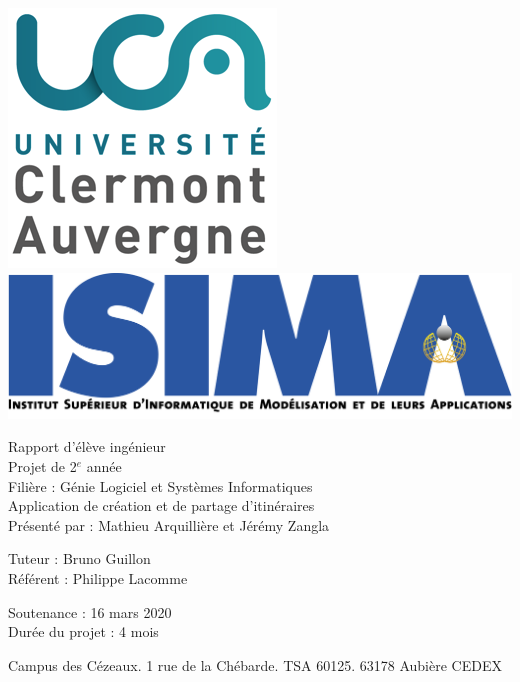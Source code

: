 \begin{titlepage}
\includegraphics[scale=0.3]{images/Logo-UCA.png}
\hfill
\includegraphics[scale=0.3]{images/isima-logo.png}

  \begin{center}
    \begin{minipage}{20cm}
      \begin{center}
        Rapport d'élève ingénieur\\
        Projet de 2$^{e}$ année\\
        Filière : Génie Logiciel et Systèmes Informatiques\\
        \vspace{10pt}
        \LARGE Application de création et de partage d'itinéraires\\
        \vspace{30pt}
        \large Présenté par : Mathieu Arquillière et Jérémy Zangla
      \end{center}
    \end{minipage}
  \end{center}

\begin{minipage}{0.4\textwidth}
\begin{flushleft}
  Tuteur : Bruno Guillon\\
  Référent : Philippe Lacomme
\end{flushleft}
\end{minipage}
\hfill
\begin{minipage}{0.4\textwidth}
\begin{flushright}
  Soutenance : 16 mars 2020\\
  Durée du projet : 4 mois
\end{flushright}
\end{minipage}

\begin{center}
Campus des Cézeaux. 1 rue de la Chébarde. TSA 60125. 63178 Aubière CEDEX
\end{center}

\end{titlepage}